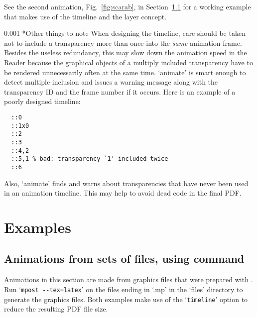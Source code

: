 \documentclass[a4paper]{article}
\makeatletter
\newcommand\myparagraph{\@startsection{paragraph}{3}{\z@}%
                                     {\parskip}%
                                     {0.001\parskip}%
                                     {\itshape\normalsize}}
\makeatother
\begin{document}
%

See the second animation, Fig.~\ref{fig:scarab}, in Section~\ref{sect:examples} for a working example that makes use of the timeline and the layer concept.

\myparagraph*{Other things to note}
When designing the timeline, care should be taken not to include a transparency more than once into the \emph{same} animation frame. Besides the useless redundancy, this may slow down the animation speed in the Reader because the graphical objects of a multiply included transparency have to be rendered unnecessarily often at the same time. `animate' is smart enough to detect multiple inclusion and issues a warning message along with the transparency ID and the frame number if it occurs. Here is an example of a poorly designed timeline:
\small
\begin{verbatim}
  ::0
  ::1x0
  ::2
  ::3
  ::4,2
  ::5,1 % bad: transparency `1' included twice
  ::6
\end{verbatim}
\normalsize
Also, `animate' finds and warns about transparencies that have never been used in an animation timeline. This may help to avoid dead code in the final PDF.

\section{Examples}
\subsection[Animations from sets of files, using `animategraphics' command]{Animations from sets of files, using {\tt \string\animategraphics} command}\label{sect:examples}
Animations in this section are made from graphics files that were prepared with \MP. Run `\verb+mpost --tex=latex+' on the files ending in `.mp' in the `files' directory to generate the graphics files. Both examples make use of the `\verb+timeline+' option to reduce the resulting PDF file size.
\end{document}
